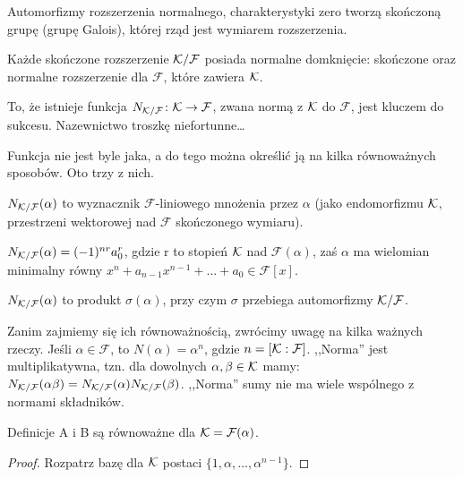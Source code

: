 Automorfizmy rozszerzenia normalnego, charakterystyki zero tworzą skończoną grupę (grupę Galois), której rząd jest wymiarem rozszerzenia.

Każde skończone rozszerzenie $\mathcal K/\mathcal F$ posiada {normalne domknięcie}: skończone oraz normalne rozszerzenie dla $\mathcal F$, które zawiera $\mathcal K$.

To, że istnieje funkcja  $N_{\mathcal K/\mathcal F} \colon \mathcal K \to \mathcal F$, zwana normą z $\mathcal K$ do $\mathcal F$, jest kluczem do sukcesu.
Nazewnictwo troszkę niefortunne\dots

Funkcja nie jest byle jaka, a do tego można określić ją na kilka równoważnych sposobów. Oto trzy z nich.

\begin{definicja}
	$N_{\mathcal K/ \mathcal F}(\alpha)$ to wyznacznik $\mathcal F$-liniowego mnożenia przez $\alpha$ (jako endomorfizmu $\mathcal K$, przestrzeni wektorowej nad $\mathcal F$ skończonego wymiaru).
\end{definicja}

\begin{definicja}
	$N_{\mathcal K/\mathcal F}(\alpha) = (-1)^{nr} a_0^r$, gdzie r to stopień $\mathcal K$ nad $\mathcal F(\alpha)$, zaś $\alpha$ ma wielomian minimalny równy $x^n + a_{n-1}x^{n-1} + \dots  + a_0 \in \mathcal F[x]$.
\end{definicja}

\begin{definicja} $N_{\mathcal K/\mathcal F}(\alpha)$ to produkt $\sigma(\alpha)$, przy czym $\sigma$ przebiega automorfizmy $\mathcal K / \mathcal F$.
\end{definicja}

Zanim zajmiemy się ich równoważnością, zwrócimy uwagę na kilka ważnych rzeczy.
Jeśli $\alpha \in \mathcal F$, to $N(\alpha) = \alpha^n$, gdzie $n = [\mathcal K : \mathcal F]$.
,,Norma'' jest multiplikatywna, tzn. dla dowolnych $\alpha, \beta \in \mathcal K$ mamy: $N_{\mathcal K / \mathcal F}(\alpha \beta) = N_{\mathcal K / \mathcal F}(\alpha) N_{\mathcal K / \mathcal F}(\beta)$.
,,Norma'' sumy nie ma wiele wspólnego z normami składników.

\begin{lemat}
	Definicje A i B są równoważne dla $\mathcal K = \mathcal F(\alpha)$.
\end{lemat}

\begin{proof}
	Rozpatrz bazę dla $\mathcal K$ postaci $\{1, \alpha, \dots, \alpha^{n-1}\}$.
\end{proof}

